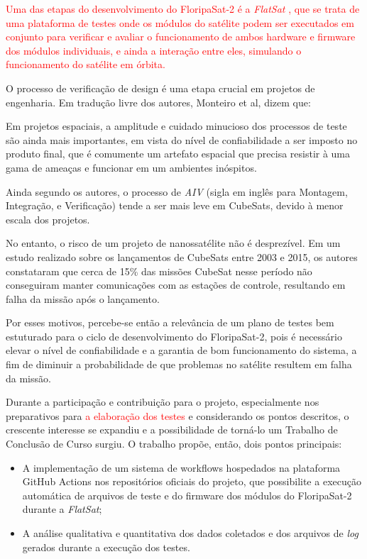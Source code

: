 \textcolor{red}{
    Uma das etapas do desenvolvimento do FloripaSat-2 é a \emph{FlatSat} \cite{floripasat2},
    que se trata de uma plataforma de testes onde os módulos do satélite podem ser executados
    em conjunto para verificar e avaliar o funcionamento de ambos hardware e firmware dos módulos
    individuais, e ainda a interação entre eles, simulando o funcionamento do satélite em órbita.
}

O processo de verificação de design é uma etapa crucial em projetos de engenharia.
Em tradução livre dos autores, Monteiro et al, dizem que:

\begin{citacao}
\hspace{1,2cm}Em projetos espaciais, a amplitude e cuidado minucioso dos processos de teste são ainda mais
importantes, em vista do nível de confiabilidade  a ser imposto no produto final, que é comumente um artefato
espacial que precisa resistir à uma gama de ameaças e funcionar em um ambientes inóspitos. \cite{aiv-cubesat}
\end{citacao}

Ainda segundo os autores, o processo de \emph{AIV} (sigla em inglês para Montagem, Integração, e Verificação)
tende a ser mais leve em CubeSats, devido à menor escala dos projetos.


No entanto, o risco de um projeto de nanossatélite não é desprezível. Em um estudo realizado sobre os lançamentos
de CubeSats entre 2003 e 2015, os autores \cite{panga2016} constataram que cerca de 15\% das missões CubeSat nesse
período não conseguiram manter comunicações com as estações de controle, resultando em falha da missão após o lançamento.

Por esses motivos, percebe-se então a relevância de um plano de testes bem estuturado para o ciclo de desenvolvimento
do FloripaSat-2, pois é necessário elevar o nível de confiabilidade e a garantia de bom funcionamento do sistema, a fim
de diminuir a probabilidade de que problemas no satélite resultem em falha da missão.

Durante a participação e contribuição para o projeto, especialmente nos preparativos para \textcolor{red}{a elaboração
dos testes} e considerando os pontos descritos, o crescente interesse se expandiu e a possibilidade de torná-lo um
Trabalho de Conclusão de Curso surgiu.
O trabalho propõe, então, dois pontos principais:

\begin{itemize}
    \item A implementação de um sistema de workflows hospedados na plataforma GitHub Actions \cite {gh-actions} nos
          repositórios oficiais do projeto, que possibilite a execução automática de arquivos de teste e do firmware
          dos módulos do FloripaSat-2 durante a \emph{FlatSat};
    \item A análise qualitativa e quantitativa dos dados coletados e dos arquivos de \emph{log} gerados durante a
          execução dos testes.
\end{itemize}

